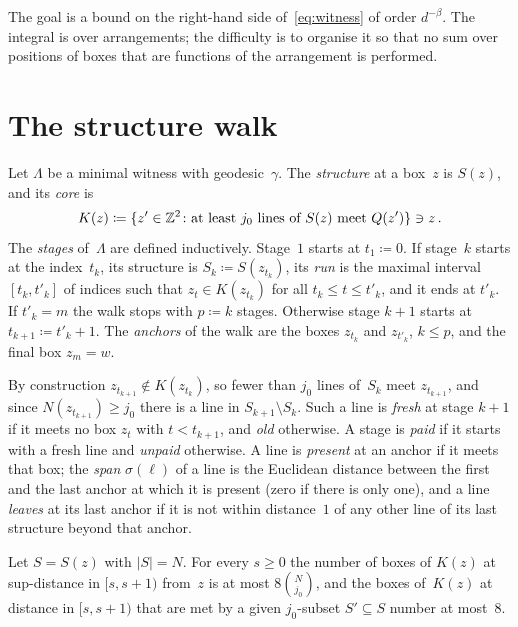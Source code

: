 \documentclass[11pt,letterpaper]{article}
\begin{document}
The goal is a bound on the right-hand side of~\eqref{eq:witness} of order $d^{-\beta}$. The integral is over arrangements; the difficulty is to organise it so that no sum over positions of boxes that are functions of the arrangement is performed.

\section{The structure walk}
\label{sec:walk}

\begin{definition}
\label{def:walk}
Let $\Lambda$ be a minimal witness with geodesic~$\gamma$. The \emph{structure} at a box~$z$ is $S(z)$, and its \emph{core} is
\begin{equation*}
  K(z)\coloneqq\{z'\in\mathbb Z^2\colon\text{at least }j_0\text{ lines of }S(z)\text{ meet }Q(z')\}\ni z\,.
\end{equation*}
The \emph{stages} of~$\Lambda$ are defined inductively. Stage~$1$ starts at $t_1\coloneqq0$. If stage~$k$ starts at the index~$t_k$, its structure is $S_k\coloneqq S(z_{t_k})$, its \emph{run} is the maximal interval $[t_k,t'_k]$ of indices such that $z_t\in K(z_{t_k})$ for all $t_k\le t\le t'_k$, and it ends at $t'_k$. If $t'_k=m$ the walk stops with $p\coloneqq k$ stages. Otherwise stage $k+1$ starts at $t_{k+1}\coloneqq t'_k+1$. The \emph{anchors} of the walk are the boxes $z_{t_k}$ and $z_{t'_k}$, $k\le p$, and the final box $z_m=w$.
\end{definition}

By construction $z_{t_{k+1}}\notin K(z_{t_k})$, so fewer than $j_0$ lines of~$S_k$ meet $z_{t_{k+1}}$, and since $N(z_{t_{k+1}})\ge j_0$ there is a line in $S_{k+1}\setminus S_k$. Such a line is \emph{fresh} at stage $k+1$ if it meets no box $z_t$ with $t<t_{k+1}$, and \emph{old} otherwise. A stage is \emph{paid} if it starts with a fresh line and \emph{unpaid} otherwise. A line is \emph{present} at an anchor if it meets that box; the \emph{span} $\sigma(\ell)$ of a line is the Euclidean distance between the first and the last anchor at which it is present (zero if there is only one), and a line \emph{leaves} at its last anchor if it is not within distance~$1$ of any other line of its last structure beyond that anchor.

\begin{lemma}
\label{lem:core}
Let $S=S(z)$ with $\lvert S\rvert=N$. For every $s\ge0$ the number of boxes of $K(z)$ at sup-distance in $[s,s+1)$ from~$z$ is at most $8\binom N{j_0}$, and the boxes of~$K(z)$ at distance in $[s,s+1)$ that are met by a given $j_0$-subset $S'\subseteq S$ number at most~$8$.
\end{lemma}
\end{document}

